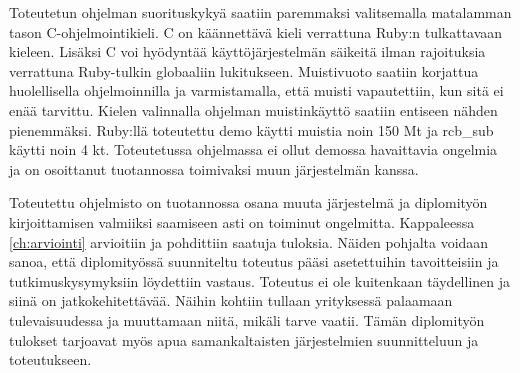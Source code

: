 Toteutetun ohjelman suorituskykyä saatiin paremmaksi valitsemalla matalamman tason C-ohjelmointikieli. C on käännettävä kieli verrattuna Ruby:n tulkattavaan kieleen. Lisäksi C voi hyödyntää käyttöjärjestelmän säikeitä ilman rajoituksia verrattuna Ruby-tulkin globaaliin lukitukseen. Muistivuoto saatiin korjattua huolellisella ohjelmoinnilla ja varmistamalla, että muisti vapautettiin, kun sitä ei enää tarvittu. Kielen valinnalla ohjelman muistinkäyttö saatiin entiseen nähden pienemmäksi. Ruby:llä toteutettu demo käytti muistia noin 150 Mt ja rcb\_sub käytti noin 4 kt. Toteutetussa ohjelmassa ei ollut demossa havaittavia ongelmia ja on osoittanut tuotannossa toimivaksi muun järjestelmän kanssa.

Toteutettu ohjelmisto on tuotannossa osana muuta järjestelmä ja diplomityön kirjoittamisen valmiiksi saamiseen asti on toiminut ongelmitta. Kappaleessa \ref{ch:arviointi} arvioitiin ja pohdittiin saatuja tuloksia. Näiden pohjalta voidaan sanoa, että diplomityössä suunniteltu toteutus pääsi asetettuihin tavoitteisiin ja tutkimuskysymyksiin löydettiin vastaus. Toteutus ei ole kuitenkaan täydellinen ja siinä on jatkokehitettävää. Näihin kohtiin tullaan yrityksessä palaamaan tulevaisuudessa ja muuttamaan niitä, mikäli tarve vaatii. Tämän diplomityön tulokset tarjoavat myös apua samankaltaisten järjestelmien suunnitteluun ja toteutukseen.